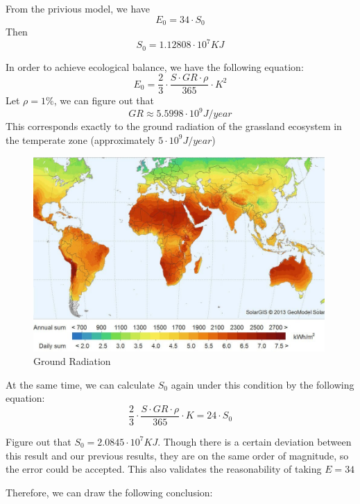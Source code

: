 \documentclass{mcmthesis}
\begin{document}
From the privious model, we have
\begin{equation}
    E_{0}=34\cdot S_{0}
\end{equation}
Then
\begin{equation}
    S_{0}=1.12808\cdot 10^{7}KJ
\end{equation}

In order to achieve ecological balance, we have the following equation:
\begin{equation}
    E_{0}=\frac{2}{3}\cdot \frac{S\cdot GR\cdot \rho}{365}\cdot K^{2}
\end{equation}
Let $\rho=1\%$, we can figure out that
\begin{equation}
    GR\approx 5.5998\cdot 10^{9} J/year
\end{equation}
This corresponds exactly to the ground radiation of the grassland ecosystem in the temperate zone (approximately $5\cdot 10^{9} J/year$)

\begin{figure}[!htbp]
    \centering
    \includegraphics[width=30em]{Solar_radiation.png}
    \caption{Ground Radiation}
\end{figure}

At the same time, we can calculate $S_{0}$ again under this condition by the following equation:
\begin{equation}
    \frac{2}{3}\cdot \frac{S\cdot GR\cdot \rho}{365}\cdot K = 24 \cdot S_{0}
\end{equation}

Figure out that $S_{0}=2.0845\cdot 10^{7}KJ$.
Though there is a certain deviation between this result and our previous results, they are on the same order of magnitude, so the error could be accepted.
This also validates the reasonability of taking $E=34$

Therefore, we can draw the following conclusion:
\end{document}
